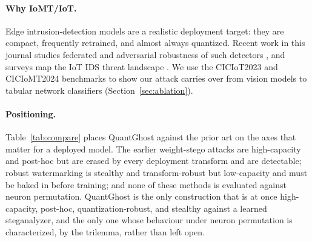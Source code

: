 \documentclass[a4paper,fleqn]{cas-dc}
\theoremstyle{plain}
\theoremstyle{remark}
\newcommand{\sys}{\mbox{QuantGhost}}
\begin{document}
\paragraph{Why IoMT/IoT.} Edge intrusion-detection models are a realistic deployment
target: they are compact, frequently retrained, and almost always quantized. Recent
work in this journal studies federated and adversarial robustness of such detectors
\citep{vadigi2023federated,yasarathna2025sok,sameera2025weidetect}, and surveys map the
IoT IDS threat landscape \citep{aydin2025idsiot}. We use the CICIoT2023
\citep{neto2023ciciot2023} and CICIoMT2024 \citep{dadkhah2024ciciomt2024} benchmarks to
show our attack carries over from vision models to tabular network classifiers
(Section~\ref{sec:ablation}).

\paragraph{Positioning.} Table~\ref{tab:compare} places \sys{} against the prior art on
the axes that matter for a deployed model. The earlier weight-stego attacks are
high-capacity and post-hoc but are erased by every deployment transform and are
detectable; robust watermarking is stealthy and transform-robust but low-capacity and
must be baked in before training; and none of these methods is evaluated against neuron
permutation. \sys{} is the only construction that is at once high-capacity, post-hoc,
quantization-robust, and stealthy against a learned steganalyzer, and the only one whose
behaviour under neuron permutation is characterized, by the trilemma, rather than left
open.
\end{document}
